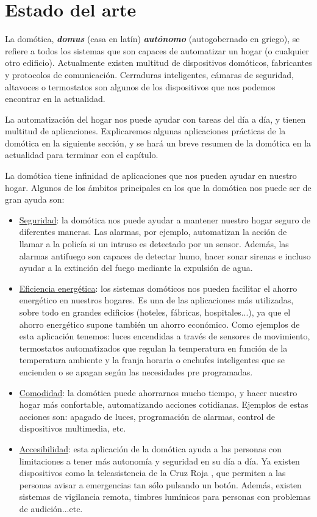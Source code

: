 \chapter{Estado del arte}
\label{chap:estadodelarte}

La domótica, \textbf{\textit{domus}} (casa en latín) \textbf{\textit{autónomo}} (autogobernado en griego), se refiere a todos los sistemas
que son capaces de automatizar un hogar (o cualquier otro edificio). Actualmente existen multitud de dispositivos domóticos, fabricantes y protocolos de comunicación.
Cerraduras inteligentes, cámaras de seguridad, altavoces o termostatos son algunos de los dispositivos que nos podemos encontrar en la actualidad.
\par
La automatización del hogar nos puede ayudar con tareas del día a día,
y tienen multitud de aplicaciones. Explicaremos algunas aplicaciones prácticas de la domótica en la siguiente sección, y se hará un breve
resumen de la domótica en la actualidad para terminar con el capítulo.


La domótica tiene infinidad de aplicaciones que nos pueden ayudar en nuestro hogar. Algunos de los ámbitos principales en los que la domótica nos puede
ser de gran ayuda son:

\begin{itemize}
\item\underline{Seguridad}: la domótica nos puede ayudar a mantener nuestro hogar seguro de diferentes maneras. Las alarmas, por ejemplo, automatizan 
la acción de llamar a la policía si un intruso es detectado por un sensor. Además, las alarmas antifuego son capaces de detectar humo, hacer sonar 
sirenas e incluso ayudar a la extinción del fuego mediante la expulsión de agua.
\item\underline{Eficiencia energética}: los sistemas domóticos nos pueden facilitar el ahorro energético en nuestros hogares. Es una de las aplicaciones
más utilizadas, sobre todo en grandes edificios (hoteles, fábricas, hospitales...), ya que el ahorro energético supone también un ahorro económico. Como ejemplos
de esta aplicación tenemos: luces encendidas a través de sensores de movimiento, termostatos automatizados que regulan la temperatura en función de la
temperatura ambiente y la franja horaria o enchufes inteligentes que se encienden o se apagan según las necesidades pre programadas.
\item\underline{Comodidad}: la domótica puede ahorrarnos mucho tiempo, y hacer nuestro hogar más confortable, automatizando acciones cotidianas. Ejemplos de estas acciones son: apagado de luces,
programación de alarmas, control de dispositivos multimedia, etc.
\item\underline{Accesibilidad}: esta aplicación de la domótica ayuda a las personas con limitaciones a tener más autonomía y seguridad en su día a día. Ya
existen dispositivos como la teleasistencia de la Cruz Roja \cite{CruzRoja:teleasistencia}, que permiten a las personas avisar a emergencias tan sólo pulsando un botón.
Además, existen sistemas de vigilancia remota, timbres lumínicos para personas con problemas de audición...etc.
\end{itemize}

